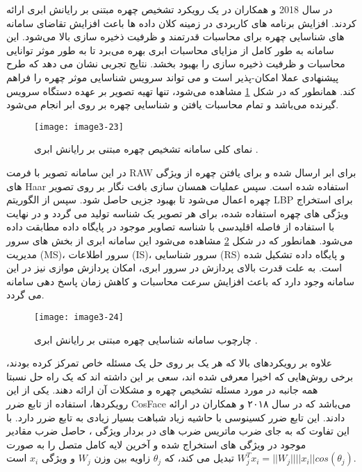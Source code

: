 \noindent
در سال 2018  و همکاران در \cite{HU2018582} یک رویکرد تشخیص چهره مبتنی بر رایانش ابری ارائه کردند. افزایش برنامه های کاربردی در زمینه کلان داده ها باعث افزایش تقاضای سامانه های شناسایی چهره برای محاسبات قدرتمند و ظرفیت ذخیره سازی بالا می‌شود. این سامانه به طور کامل از مزایای محاسبات ابری بهره می‌برد تا به طور موثر توانایی محاسبات و ظرفیت ذخیره سازی را بهبود بخشد. نتایج تجربی نشان می دهد که طرح پیشنهادی عملا امکان-پذیر است و می تواند سرویس شناسایی موثر چهره را فراهم کند. همانطور که در شکل \ref{image3-23} مشاهده می‌شود، تنها تهیه تصویر بر عهده دستگاه سرویس گیرنده می‌باشد و تمام محاسبات یافتن و شناسایی چهره بر روی ابر انجام می‌شود.
 \begin{figure}[h]
\centering
  \texttt{[image: image3-23]}
  \caption{نمای کلی سامانه تشخیص چهره مبتنی بر رایانش ابری \cite{HU2018582}.}
  \label{image3-23}
\end{figure}

\noindent
در این سامانه تصویر با فرمت RAW برای ابر ارسال شده و برای یافتن چهره از ویژگی های Haar استفاده شده است. سپس عملیات همسان سازی بافت نگار بر روی تصویر چهره اعمال می‌شود تا بهبود جزیی حاصل شود. سپس از الگوریتم LBP برای استخراج ویژگی های چهره استفاده شده، برای هر تصویر یک شناسه تولید می گردد و در نهایت با استفاده از فاصله اقلیدسی با شناسه تصاویر موجود در پایگاه داده مطابقت داده می‌شود. همانطور که در شکل \ref{image3-24} مشاهده می‌شود این سامانه ابری از بخش های سرور مدیریت (MS)، سرور اطلاعات (IS)، سرور شناسایی (RS) و پایگاه داده تشکیل شده است. به علت قدرت بالای پردازش در سرور ابری، امکان پردازش موازی نیز در این سامانه وجود دارد که باعث افزایش سرعت محاسبات و کاهش زمان پاسخ دهی سامانه می گردد. 

\begin{figure}[h]
\centering
  \texttt{[image: image3-24]}
  \caption{چارچوب سامانه شناسایی چهره مبتنی بر رایانش ابری \cite{HU2018582}.}
  \label{image3-24}
\end{figure}

\noindent
علاوه بر رویکردهای بالا که هر یک بر روی حل یک مسئله خاص تمرکز کرده بودند، برخی روش‌هایی که اخیرا معرفی شده اند، سعی بر این داشته اند که یک راه حل نسبتا همه جانبه در مورد مسئله تشخیص چهره و مشکلات آن ارائه دهند. یکی از این رویکردها، استفاده از تابع ضرر CosFace می‌باشد که در سال ۲۰۱۸  و همکاران در \cite{wang2018cosface} ارائه دادند. این تابع ضرر کسینوسی با حاشیه زیاد  شباهت بسیار زیادی به تابع ضرر  دارد. با این تفاوت که به جای ضرب ماتریس ضرب های  در بردار ویژگی ، حاصل ضرب مقادیر موجود در ویژگی های استخراج شده و آخرین لایه کامل
متصل را به صورت
$W_j^T x_i = ||W_j|| ||x_i|| cos(θ_j)$
تبدیل می کند، که $\theta_j$ زاویه بین وزن $W_j$ و ویژگی $x_i$ است.

